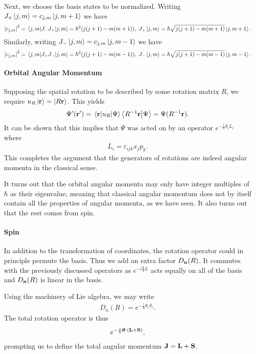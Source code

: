 Next, we choose the basis states to be normalized. Writing $J_{+}\ket{j, m} = c_{j, m}\ket{j, m + 1}$ we have
\begin{align*}
	\abs{c_{j, m}}^{2} = \expval{J_{-}J_{+}}{j, m} = \hbar^{2}(j(j + 1) - m(m + 1)),\ J_{+}\ket{j, m} = \hbar\sqrt{j(j + 1) - m(m + 1)}\ket{j, m + 1}.
\end{align*}
Similarly, writing $J_{-}\ket{j, m} = c_{j, m}\ket{j, m - 1}$ we have
\begin{align*}
	\abs{c_{j, m}}^{2} = \expval{J_{+}J_{-}}{j, m} = \hbar^{2}(j(j + 1) - m(m - 1)),\ J_{-}\ket{j, m} = \hbar\sqrt{j(j + 1) - m(m - 1)}\ket{j, m - 1}.
\end{align*}

\paragraph{Orbital Angular Momentum}
Supposing the spatial rotation to be described by some rotation matrix $R$, we require $u_{R}\ket{\vb{r}} = \ket{R\vb{r}}$. This yields
\begin{align*}
	\Psi^{\prime}(\vb{r}^{\prime}) = \mel{\vb{r}}{u_{R}}{\Psi} \braket{R^{-1}\vb{r}}{\Psi} = \Psi(R^{-1}\vb{r}).
\end{align*}
It can be shown that this implies that $\Psi$ was acted on by an operator $e^{-\frac{i}{\hbar}\theta_{i}L_{i}}$ where
\begin{align*}
	L_{i} = \varepsilon_{ijk}x_{j}p_{k}.
\end{align*}
This completes the argument that the generators of rotations are indeed angular momenta in the classical sense.

It turns out that the orbital angular momenta may only have integer multiples of $\hbar$ as their eigenvalue, meaning that classical angular momentum does not by itself contain all the properties of angular momenta, as we have seen. It also turns out that the rest comes from spin.

\paragraph{Spin}
In addition to the transformation of coordinates, the rotation operator could in principle permute the basis. Thus we add an extra factor $D_{\vb{n}}(R)$. It commutes with the previously discussed operators as $e^{-i\frac{\theta}{\hbar}L}$ acts equally on all of the basis and $D_{\vb{n}}(R)$ is linear in the basis.

Using the machinery of Lie algebra, we may write
\begin{align*}
	D_{n}(R) = e^{-\frac{i}{\hbar}\theta_{i}S_{i}}.
\end{align*}
The total rotation operator is thus
\begin{align*}
	e^{-\frac{i}{\hbar}\vb*{\theta}\cdot(\vb{L} + \vb{S})},
\end{align*}
prompting us to define the total angular momentum $\vb{J} = \vb{L} + \vb{S}$.

